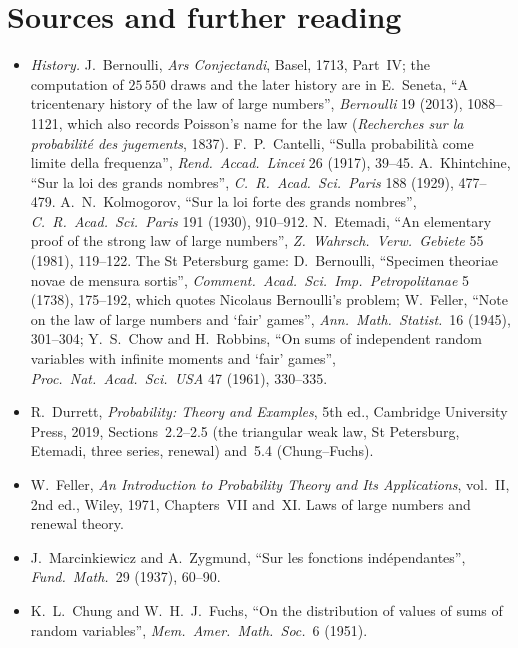 \section*{Sources and further reading}

\begin{itemize}
\item \emph{History.} J.~Bernoulli, \emph{Ars Conjectandi}, Basel, 1713, Part~IV; the computation of $25\,550$ draws and the later history are in E.~Seneta,
``A tricentenary history of the law of large numbers'', \emph{Bernoulli} 19 (2013), 1088--1121, which also records Poisson's name for the law (\emph{Recherches
sur la probabilit\'e des jugements}, 1837). F.~P.~Cantelli, ``Sulla probabilit\`a come limite della frequenza'', \emph{Rend.\ Accad.\ Lincei} 26 (1917), 39--45.
A.~Khintchine, ``Sur la loi des grands nombres'', \emph{C.\ R.\ Acad.\ Sci.\ Paris} 188 (1929), 477--479. A.~N.~Kolmogorov, ``Sur la loi forte des grands nombres'',
\emph{C.\ R.\ Acad.\ Sci.\ Paris} 191 (1930), 910--912. N.~Etemadi, ``An elementary proof of the strong law of large numbers'', \emph{Z.\ Wahrsch.\ Verw.\ Gebiete}
55 (1981), 119--122. The St Petersburg game: D.~Bernoulli, ``Specimen theoriae novae de mensura sortis'', \emph{Comment.\ Acad.\ Sci.\ Imp.\ Petropolitanae} 5 (1738),
175--192, which quotes Nicolaus Bernoulli's problem; W.~Feller, ``Note on the law of large numbers and `fair' games'', \emph{Ann.\ Math.\ Statist.}\ 16 (1945), 301--304;
Y.~S.~Chow and H.~Robbins, ``On sums of independent random variables with infinite moments and `fair' games'', \emph{Proc.\ Nat.\ Acad.\ Sci.\ USA} 47 (1961), 330--335.
\item R.~Durrett, \emph{Probability: Theory and Examples}, 5th ed., Cambridge University Press, 2019, Sections~2.2--2.5 (the triangular weak law, St Petersburg,
Etemadi, three series, renewal) and~5.4 (Chung--Fuchs).
\item W.~Feller, \emph{An Introduction to Probability Theory and Its Applications}, vol.~II, 2nd ed., Wiley, 1971, Chapters~VII and~XI. Laws of large numbers and
renewal theory.
\item J.~Marcinkiewicz and A.~Zygmund, ``Sur les fonctions ind\'ependantes'', \emph{Fund.\ Math.}\ 29 (1937), 60--90.
\item K.~L.~Chung and W.~H.~J.~Fuchs, ``On the distribution of values of sums of random variables'', \emph{Mem.\ Amer.\ Math.\ Soc.}\ 6 (1951).
\end{itemize}
